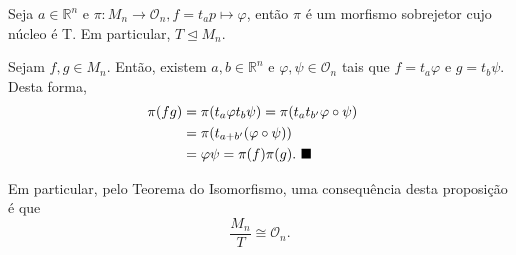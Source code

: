 \documentclass[Algebra/algebra_notes.tex]{subfiles}
\begin{document}
\begin{prop*}
	Seja $a\in \mathbb{R}^{n}$ e $\pi :M_{n}\rightarrow \mathcal{O}_{n}, f=t_{a}p\mapsto \varphi $, então $\pi $
	é um morfismo sobrejetor cujo núcleo é T. Em particular, $T\trianglelefteq{M_{n}}.$
\end{prop*}
\begin{proof*}
	Sejam $f, g\in M_{n}.$ Então, existem $a, b\in \mathbb{R}^{n}$ e $\varphi , \psi\in \mathcal{O}_{n}$ tais que
	$f=t_{a}\varphi $ e $g=t_{b}\psi.$ Desta forma,
	\begin{align*}
		\pi (fg) & = \pi (t_{a}\varphi t_{b}\psi)=\pi (t_{a}t_{b'}\varphi\circ{\psi}) & \\
		         & =\pi (t_{a+b'}(\varphi\circ{\psi}))                                  \\
		         & =\varphi \psi = \pi (f)\pi (g).\text{ $\blacksquare$}
	\end{align*}
\end{proof*}
Em particular, pelo Teorema do Isomorfismo, uma consequência desta proposição é que
$$
	\frac{M_{n}}{T}\cong{\mathcal{O}_{n}}.
$$
\end{document}
